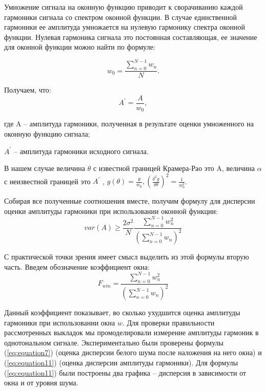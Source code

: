 Умножение сигнала на оконную функцию приводит к сворачиванию каждой гармоники сигнала со спектром оконной функции. В случае единственной гармоники ее амплитуда умножается на нулевую гармонику спектра оконной функции. Нулевая гармоника сигнала это постоянная составляющая, ее значение для оконной функции можно найти по формуле: 

\begin{equation}
	\label{eq:equation9}
	w_0= \frac{\sum_{n=0}^{N-1} w_n}{N}.	  
\end{equation}

Получаем, что: 
\begin{equation}
	\label{eq:equation10}
	A^{'}=\frac{A}{w_0} ,		  
\end{equation}

где A -- амплитуда гармоники, полученная в результате оценки умноженного на оконную функцию сигнала; 

$A^{'}$ -- амплитуда гармоники исходного сигнала.

В нашем случае величина $\theta$ с известной границей Крамера-Рао это A, величина $\alpha$ с неизвестной границей это  $A^{'}$ , $g(\theta)=\frac{\theta}{w_0}, \left(\frac{\delta^2 g}{\delta \theta}\right)^2=\frac{1}{w_0^2}$.

Собирая все полученные соотношения вместе, получим формулу для дисперсии оценки амплитуды гармоники при использовании оконной функции: 
\begin{equation}
	\label{eq:equation11}
	var(A)\geq \frac{2\sigma^2}{N} \frac{\sum_{n=0}^{N-1}w_n^2}{\left(\sum_{n=0}^{N-1} w_n \right)^2} 			  
\end{equation}


С практической точки зрения имеет смысл выделить из этой формулы вторую часть. Введем обозначение коэффициент окна: 
\begin{equation}
	\label{eq:equation12}
	F_{win}=\frac{\sum_{n=0}^{N-1}w_n^2}{\left(\sum_{n=0}^{N-1} w_n\right)^2}
\end{equation}

Данный коэффициент показывает, во сколько ухудшится оценка амплитуды гармоники при использовании окна $w$.
Для проверки правильности рассмотренных выкладок мы промоделировали измерение амплитуды гармоник в однотональном сигнале. Экспериментально были проверены формулы (\ref{eq:equation7}) (оценка дисперсии белого шума после наложения на него окна) и (\ref{eq:equation11}) (оценка дисперсии амплитуды гармоники). Для формулы (\ref{eq:equation11}) были построены два графика -- дисперсия в зависимости от окна и от уровня шума.

